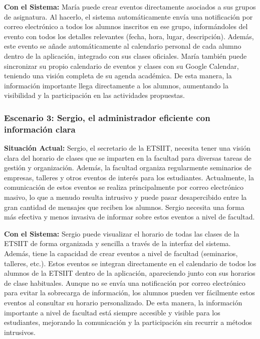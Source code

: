 \textbf{Con el Sistema:} María puede crear eventos directamente asociados a sus grupos de asignatura. Al hacerlo, el sistema automáticamente envía una notificación por correo electrónico a todos los alumnos inscritos en ese grupo, informándoles del evento con todos los detalles relevantes (fecha, hora, lugar, descripción). Además, este evento se añade automáticamente al calendario personal de cada alumno dentro de la aplicación, integrado con sus clases oficiales. María también puede sincronizar su propio calendario de eventos y clases con su Google Calendar, teniendo una visión completa de su agenda académica. De esta manera, la información importante llega directamente a los alumnos, aumentando la visibilidad y la participación en las actividades propuestas.

\subsubsection*{Escenario 3: Sergio, el administrador eficiente con información clara}

\textbf{Situación Actual:} Sergio, el secretario de la ETSIIT, necesita tener una visión clara del horario de clases que se imparten en la facultad para diversas tareas de gestión y organización. Además, la facultad organiza regularmente seminarios de empresas, talleres y otros eventos de interés para los estudiantes. Actualmente, la comunicación de estos eventos se realiza principalmente por correo electrónico masivo, lo que a menudo resulta intrusivo y puede pasar desapercibido entre la gran cantidad de mensajes que reciben los alumnos. Sergio necesita una forma más efectiva y menos invasiva de informar sobre estos eventos a nivel de facultad.

\textbf{Con el Sistema:} Sergio puede visualizar el horario de todas las clases de la ETSIIT de forma organizada y sencilla a través de la interfaz del sistema. Además, tiene la capacidad de crear eventos a nivel de facultad (seminarios, talleres, etc.). Estos eventos se integran directamente en el calendario de todos los alumnos de la ETSIIT dentro de la aplicación, apareciendo junto con sus horarios de clase habituales. Aunque no se envía una notificación por correo electrónico para evitar la sobrecarga de información, los alumnos pueden ver fácilmente estos eventos al consultar su horario personalizado. De esta manera, la información importante a nivel de facultad está siempre accesible y visible para los estudiantes, mejorando la comunicación y la participación sin recurrir a métodos intrusivos.

